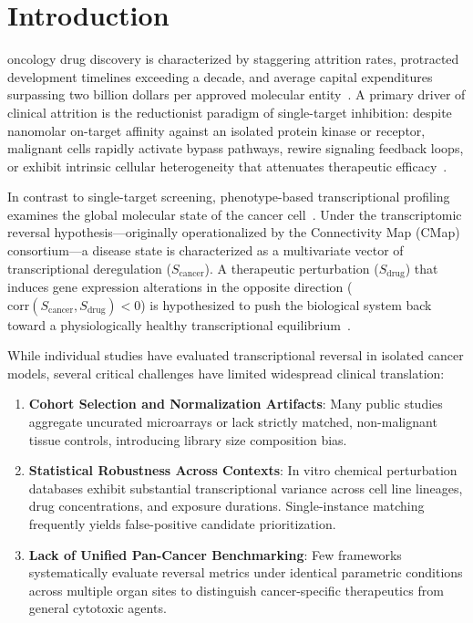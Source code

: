\documentclass[10pt,journal,compsoc,twocolumn]{IEEEtran}
\begin{document}
\maketitle
\IEEEdisplaynontitleabstractindextext
\IEEEpeerreviewmaketitle

\section{Introduction}
 oncology drug discovery is characterized by staggering attrition rates, protracted development timelines exceeding a decade, and average capital expenditures surpassing two billion dollars per approved molecular entity~\cite{dimasi2016innovation}. A primary driver of clinical attrition is the reductionist paradigm of single-target inhibition: despite nanomolar on-target affinity against an isolated protein kinase or receptor, malignant cells rapidly activate bypass pathways, rewire signaling feedback loops, or exhibit intrinsic cellular heterogeneity that attenuates therapeutic efficacy~\cite{vogelstein2013cancer}.

In contrast to single-target screening, phenotype-based transcriptional profiling examines the global molecular state of the cancer cell~\cite{lamb2006connectivity}. Under the transcriptomic reversal hypothesis---originally operationalized by the Connectivity Map (CMap) consortium---a disease state is characterized as a multivariate vector of transcriptional deregulation ($S_{\text{cancer}}$). A therapeutic perturbation ($S_{\text{drug}}$) that induces gene expression alterations in the opposite direction ($\text{corr}(S_{\text{cancer}}, S_{\text{drug}}) < 0$) is hypothesized to push the biological system back toward a physiologically healthy transcriptional equilibrium~\cite{subramanian2017lincs}.

While individual studies have evaluated transcriptional reversal in isolated cancer models, several critical challenges have limited widespread clinical translation:
\begin{enumerate}
    \item \textbf{Cohort Selection and Normalization Artifacts}: Many public studies aggregate uncurated microarrays or lack strictly matched, non-malignant tissue controls, introducing library size composition bias.
    \item \textbf{Statistical Robustness Across Contexts}: In vitro chemical perturbation databases exhibit substantial transcriptional variance across cell line lineages, drug concentrations, and exposure durations. Single-instance matching frequently yields false-positive candidate prioritization.
    \item \textbf{Lack of Unified Pan-Cancer Benchmarking}: Few frameworks systematically evaluate reversal metrics under identical parametric conditions across multiple organ sites to distinguish cancer-specific therapeutics from general cytotoxic agents.
\end{enumerate}
\end{document}
